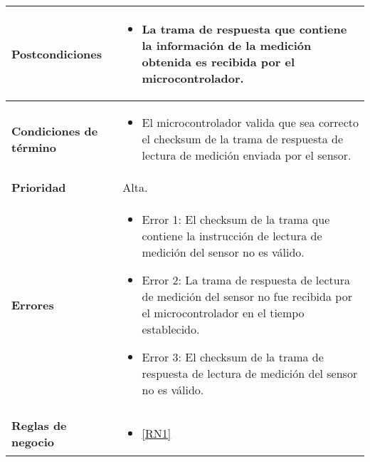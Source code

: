 \begin{longtable}{|J{5cm}|J{10.3cm}|}
	\textbf{Postcondiciones} &
		\begin{itemize}
			\item La trama de respuesta que contiene la información de la medición obtenida es recibida por el microcontrolador.
		\end{itemize} \\ \hline
	\textbf{Condiciones de término} & 
		\begin{itemize}
		    \item El microcontrolador valida que sea correcto el checksum de la trama de respuesta de lectura de medición enviada por el sensor.
		\end{itemize} 
		\\ \hline 
	\textbf{Prioridad} & 
		Alta. \\ \hline
	\textbf{Errores} &
		 \begin{itemize}
		 	\item \label{SUB-M-CU1.3:Error1} Error 1: El checksum de la trama que contiene la instrucción de lectura de medición del sensor no es válido.
		 	\item \label{SUB-M-CU1.3:Error2} Error 2: La trama de respuesta de lectura de medición del sensor no fue recibida por el microcontrolador en el tiempo establecido.
		 	\item \label{SUB-M-CU1.3:Error3} Error 3: El checksum de la trama de respuesta de lectura de medición del sensor no es válido.
		 \end{itemize} \\ \hline
	\textbf{Reglas de negocio} & 
	    \begin{itemize}
	      \item  \ref{RN1}
		 \end{itemize}\\ \hline
\end{longtable}

